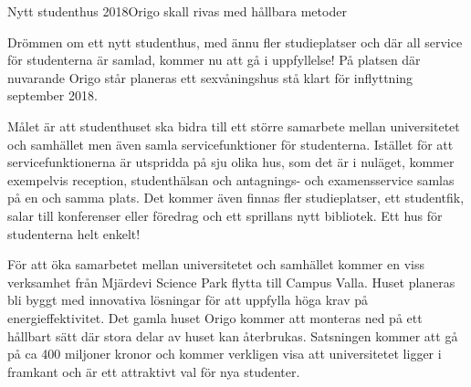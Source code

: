 \begin{news}{3}{Nytt studenthus 2018}{Origo skall rivas med hållbara metoder}{}{}

Drömmen om ett nytt studenthus, med ännu fler studieplatser och där
all service för studenterna är samlad, kommer nu att gå i
uppfyllelse! På platsen där nuvarande Origo står planeras ett
sexvåningshus stå klart för inflyttning september 2018.


Målet är att studenthuset ska bidra till ett större samarbete mellan
universitetet och samhället men även samla servicefunktioner för
studenterna. Istället för att servicefunktionerna är utspridda på sju
olika hus, som det är i nuläget, kommer exempelvis reception,
studenthälsan och antagnings- och examensservice samlas på en och
samma plats. Det kommer även finnas fler studieplatser, ett
studentfik, salar till konferenser eller föredrag och ett sprillans
nytt bibliotek. Ett hus för studenterna helt enkelt!

För att öka samarbetet mellan universitetet och samhället kommer en
viss verksamhet från Mjärdevi Science Park flytta till Campus
Valla. Huset planeras bli byggt med innovativa lösningar för att
uppfylla höga krav på energieffektivitet. Det gamla huset Origo kommer
att monteras ned på ett hållbart sätt där stora delar av huset kan
återbrukas. Satsningen kommer att gå på ca 400 miljoner kronor och
kommer verkligen visa att universitetet ligger i framkant och är ett
attraktivt val för nya studenter.



\end{news}